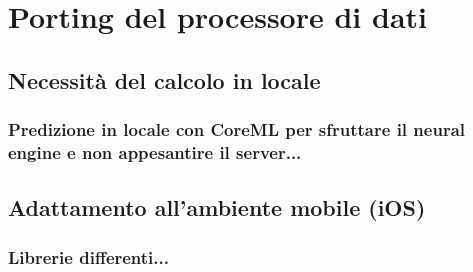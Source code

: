 \chapter{Porting del processore di dati}
\section{Necessità del calcolo in locale}
\subsection{Predizione in locale con CoreML per sfruttare il neural engine e non appesantire
il server...}
\section{Adattamento all'ambiente mobile (iOS)}
\subsection{Librerie differenti...}